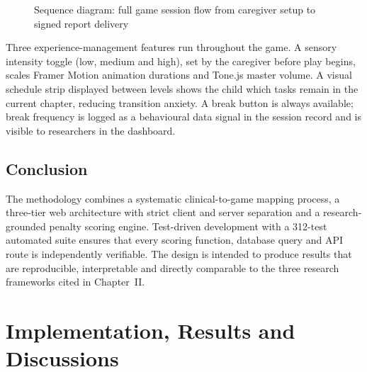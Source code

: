 \documentclass[12pt,a4paper,oneside]{report}
\begin{document}
\begin{figure}[H]
{}
		\caption{Sequence diagram: full game session flow from caregiver setup to signed report delivery}
		\label{fig:seqsession}
	\end{figure}
	
	Three experience-management features run throughout the game. A sensory intensity toggle (low, medium and high), set by the caregiver before play begins, scales Framer Motion animation durations and Tone.js master volume. A visual schedule strip displayed between levels shows the child which tasks remain in the current chapter, reducing transition anxiety. A break button is always available; break frequency is logged as a behavioural data signal in the session record and is visible to researchers in the dashboard.
	
	\clearpage
	
	\section{Conclusion}
	
	The methodology combines a systematic clinical-to-game mapping process, a three-tier web architecture with strict client and server separation and a research-grounded penalty scoring engine. Test-driven development with a 312-test automated suite ensures that every scoring function, database query and API route is independently verifiable. The design is intended to produce results that are reproducible, interpretable and directly comparable to the three research frameworks cited in Chapter~II.
	
	\clearpage
	\chapter{Implementation, Results and Discussions}
	
\end{document}
